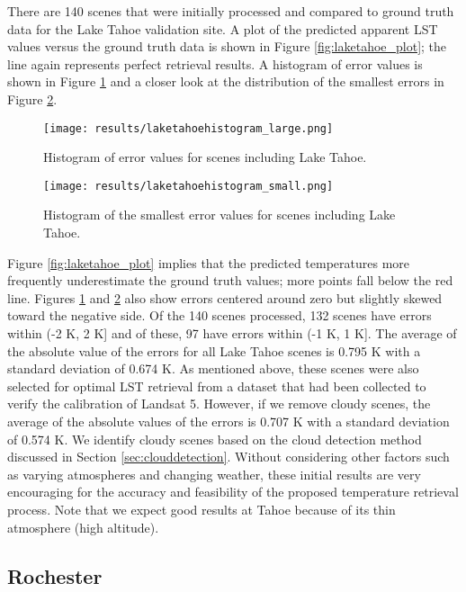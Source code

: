 \documentclass{book}
\begin{document}
There are 140 scenes that were initially processed and compared to ground truth data for the Lake Tahoe validation site.  A plot of the predicted apparent LST values versus the ground truth data is shown in Figure \ref{fig:laketahoe_plot}; the line again represents perfect retrieval results.  A histogram of error values is shown in Figure \ref{fig:laketahoehistogram_large} and a closer look at the distribution of the smallest errors in Figure \ref{fig:laketahoehistogram_small}.

\begin{figure}[H]
\centering
\texttt{[image: results/laketahoehistogram\_large.png]}
\caption{Histogram of error values for scenes including Lake Tahoe.}
\label{fig:laketahoehistogram_large}
\end{figure}

\begin{figure}[H]
\centering
\texttt{[image: results/laketahoehistogram\_small.png]}
\caption{Histogram of the smallest error values for scenes including Lake Tahoe.}
\label{fig:laketahoehistogram_small}
\end{figure}

Figure \ref{fig:laketahoe_plot} implies that the predicted temperatures more frequently underestimate the ground truth values; more points fall below the red line.  Figures \ref{fig:laketahoehistogram_large} and \ref{fig:laketahoehistogram_small} also show errors centered around zero but slightly skewed toward the negative side.  Of the 140 scenes processed, 132 scenes have errors within (-2 K, 2 K] and of these, 97 have errors within (-1 K, 1 K].  The average of the absolute value of the errors for all Lake Tahoe scenes is 0.795 K with a standard deviation of 0.674 K.  As mentioned above, these scenes were also selected for optimal LST retrieval from a dataset that had been collected to verify the calibration of Landsat 5.  However, if we remove cloudy scenes, the average of the absolute values of the errors is 0.707 K with a standard deviation of 0.574 K.  We identify cloudy scenes based on the cloud detection method discussed in Section \ref{sec:clouddetection}.  Without considering other factors such as varying atmospheres and changing weather, these initial results are very encouraging for the accuracy  and feasibility of the proposed temperature retrieval process.  Note that we expect good results at Tahoe because of its thin atmosphere (high altitude).

\subsection{Rochester}
\end{document}
